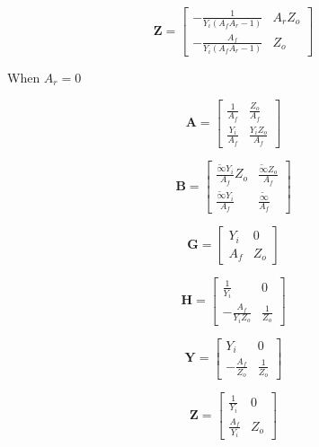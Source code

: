 \documentclass[a4paper, 12pt]{article}
\newcommand{\mat}[1]{\mathbf{#1}}
\begin{document}
\begin{equation}
\mat{Z} = \left[\begin{matrix}- \frac{1}{Y_{i} \left(A_{f} A_{r} - 1\right)} & A_{r} Z_{o}\\- \frac{A_{f}}{Y_{i} \left(A_{f} A_{r} - 1\right)} & Z_{o}\end{matrix}\right]
\end{equation}


When $A_r=0$

\begin{equation}
\mat{A} = \left[\begin{matrix}\frac{1}{A_{f}} & \frac{Z_{o}}{A_{f}}\\\frac{Y_{i}}{A_{f}} & \frac{Y_{i} Z_{o}}{A_{f}}\end{matrix}\right]
\end{equation}

\begin{equation}
\mat{B} = \left[\begin{matrix}\frac{\tilde{\infty} Y_{i}}{A_{f}} Z_{o} & \frac{\tilde{\infty} Z_{o}}{A_{f}}\\\frac{\tilde{\infty} Y_{i}}{A_{f}} & \frac{\tilde{\infty}}{A_{f}}\end{matrix}\right]
\end{equation}

\begin{equation}
\mat{G} = \left[\begin{matrix}Y_{i} & 0\\A_{f} & Z_{o}\end{matrix}\right]
\end{equation}

\begin{equation}
\mat{H} =\left[\begin{matrix}\frac{1}{Y_{i}} & 0\\- \frac{A_{f}}{Y_{i} Z_{o}} & \frac{1}{Z_{o}}\end{matrix}\right]
\end{equation}


\begin{equation}
\mat{Y} = \left[\begin{matrix}Y_{i} & 0\\- \frac{A_{f}}{Z_{o}} & \frac{1}{Z_{o}}\end{matrix}\right]
\end{equation}

\begin{equation}
\mat{Z} = \left[\begin{matrix}\frac{1}{Y_{i}} & 0\\\frac{A_{f}}{Y_{i}} & Z_{o}\end{matrix}\right]
\end{equation}
\end{document}
